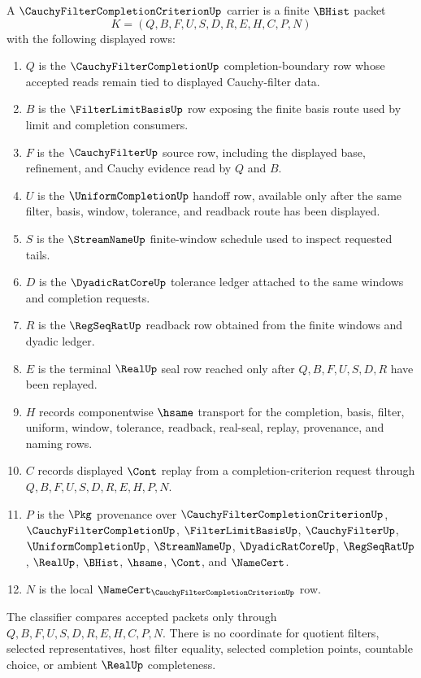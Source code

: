 \begin{definition}
\label{def:cauchy-filter-completion-criterion-carrier}
A $\CauchyFilterCompletionCriterionUp$ carrier is a finite $\BHist$ packet
$$
K=(Q,B,F,U,S,D,R,E,H,C,P,N)
$$
with the following displayed rows:
\begin{enumerate}
\item $Q$ is the $\CauchyFilterCompletionUp$ completion-boundary row whose accepted reads remain tied to displayed Cauchy-filter data.
\item $B$ is the $\FilterLimitBasisUp$ row exposing the finite basis route used by limit and completion consumers.
\item $F$ is the $\CauchyFilterUp$ source row, including the displayed base, refinement, and Cauchy evidence read by $Q$ and $B$.
\item $U$ is the $\UniformCompletionUp$ handoff row, available only after the same filter, basis, window, tolerance, and readback route has been displayed.
\item $S$ is the $\StreamNameUp$ finite-window schedule used to inspect requested tails.
\item $D$ is the $\DyadicRatCoreUp$ tolerance ledger attached to the same windows and completion requests.
\item $R$ is the $\RegSeqRatUp$ readback row obtained from the finite windows and dyadic ledger.
\item $E$ is the terminal $\RealUp$ seal row reached only after $Q,B,F,U,S,D,R$ have been replayed.
\item $H$ records componentwise $\hsame$ transport for the completion, basis, filter, uniform, window, tolerance, readback, real-seal, replay, provenance, and naming rows.
\item $C$ records displayed $\Cont$ replay from a completion-criterion request through $Q,B,F,U,S,D,R,E,H,P,N$.
\item $P$ is the $\Pkg$ provenance over $\CauchyFilterCompletionCriterionUp$, $\CauchyFilterCompletionUp$, $\FilterLimitBasisUp$, $\CauchyFilterUp$, $\UniformCompletionUp$, $\StreamNameUp$, $\DyadicRatCoreUp$, $\RegSeqRatUp$, $\RealUp$, $\BHist$, $\hsame$, $\Cont$, and $\NameCert$.
\item $N$ is the local $\NameCert_{\CauchyFilterCompletionCriterionUp}$ row.
\end{enumerate}
The classifier compares accepted packets only through $Q,B,F,U,S,D,R,E,H,C,P,N$. There is no coordinate for quotient filters, selected representatives, host filter equality, selected completion points, countable choice, or ambient $\RealUp$ completeness.
\end{definition}

